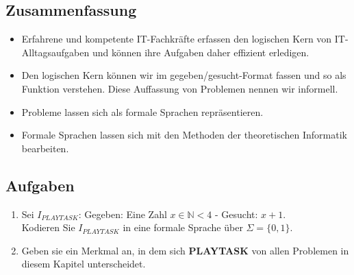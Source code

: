 \subsection*{Zusammenfassung}
\begin{itemize}
    \item Erfahrene und kompetente IT-Fachkräfte erfassen den logischen Kern
        von IT-Alltagsaufgaben und können ihre Aufgaben daher effizient erledigen.
    \item Den logischen Kern können wir im gegeben/gesucht-Format fassen
        und so als Funktion verstehen. Diese Auffassung von Problemen nennen wir informell.
    \item Probleme lassen sich als formale Sprachen repräsentieren.
    \item Formale Sprachen lassen sich mit den Methoden der theoretischen Informatik
        bearbeiten.
\end{itemize}
\subsection*{Aufgaben}
\begin{enumerate}
    \item Sei $I_{PLAYTASK}$: Gegeben: Eine Zahl $x \in \mathbb{N} < 4$ - Gesucht: $x + 1$.\\
        Kodieren Sie $I_{PLAYTASK}$ in eine formale Sprache über $\Sigma = \{0,1\}$.
    \item Geben sie ein Merkmal an, in dem sich \textbf{PLAYTASK} von allen Problemen
        in diesem Kapitel unterscheidet.
\end{enumerate}
